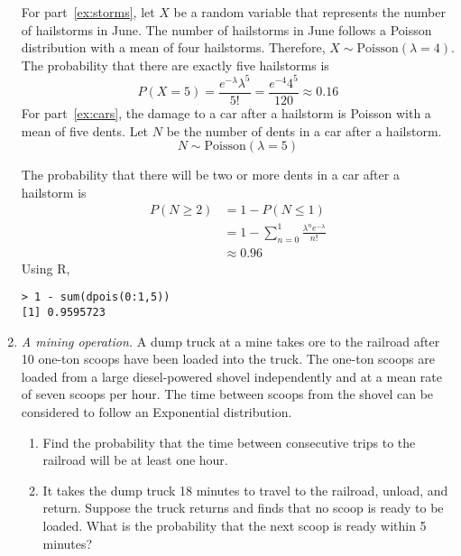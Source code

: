 \begin{enumerate}
\begin{solution}
  \bs For part~\ref{ex:storms}, let $X$ be a random variable that
  represents the number of hailstorms in June. The number of
  hailstorms in June follows a Poisson distribution with a mean of
  four hailstorms. Therefore, $X \sim \text{Poisson}(\lambda = 4)$.
  The probability that there are exactly five hailstorms is
\[
P(X=5) = \frac{e^{-\lambda}\lambda^5}{5!} = \frac{e^{-4}4^5}{120} \approx 0.16
\]
For part~\ref{ex:cars}, the damage to a car after a hailstorm is
Poisson with a mean of five dents. Let $N$ be the number of dents in a
car after a hailstorm.
\[ N \sim \text{Poisson}(\lambda = 5) \] 

The probability that there will be two or more dents in a car after a
hailstorm is
\begin{align*}
      P(N \geq 2) &= 1 - P(N \leq 1) \\
      &= 1 - \sum_{n=0}^{1} \frac{\lambda^n e^{-\lambda}}{n!}\\
      &\approx 0.96
\end{align*}
Using R,
\begin{Verbatim}
> 1 - sum(dpois(0:1,5))
[1] 0.9595723
\end{Verbatim}
\end{solution}

\item \emph{A mining operation.} A dump truck at a mine takes ore to
  the railroad after 10 one-ton scoops have been loaded into the
  truck.  The one-ton scoops are loaded from a large diesel-powered
  shovel independently and at a mean rate of seven scoops per hour.
  The time between scoops from the shovel can be considered to follow
  an Exponential distribution.

\begin{enumerate}
\item Find the probability that the time between consecutive trips to
  the railroad will be at least one hour.
\item It takes the dump truck 18 minutes to travel to the railroad,
  unload, and return. Suppose the truck returns and finds that no
  scoop is ready to be loaded. What is the probability that the next
  scoop is ready within 5 minutes? \label{item:2}
\end{enumerate}


\end{enumerate}
